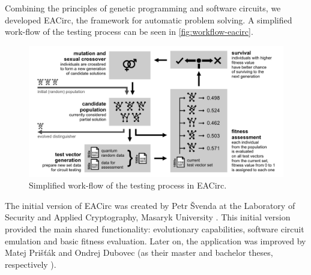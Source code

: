\documentclass[12pt,oneside]{fithesis2}
\begin{document}
Combining the principles of genetic programming and software circuits, we developed EACirc, the framework for automatic
problem solving. %
A simplified work-flow of the testing process can be seen in \autoref{fig:workflow-eacirc}.

\begin{figure}[b!]
\centering
\includegraphics[width=\textwidth]{images/workflow-eacirc}
\caption{Simplified work-flow of the testing process in EACirc.}
\label{fig:workflow-eacirc}
\end{figure}

The initial version of EACirc was created by Petr Švenda at 
the Laboratory of Security and Applied Cryptography, Masaryk University \parencite{labak}.
This initial version provided the main shared functionality: evolutionary capabilities, software circuit emulation
and basic fitness evaluation. Later on, the application was improved by Matej Prišťák and Ondrej Dubovec 
(as their master and bachelor theses, respectively \parencite{thesis-pristak, thesis-dubovec}).
\end{document}

